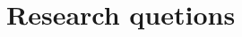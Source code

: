                                                                                                                                                                                                                                                                                                                                                                                                                                                                                                                                                                                                                                                                                                                                                                                                                                                                                                                                                                                                                                                                                                                                                                                                                                                                                                                                                                                                                                                                                                                                                                                                                                                                                                                                                                                                                                                                                                                                                                                                                                                                                                                                                                                                                                                                                                                                                                                                                                                                                                                                                                                                                           \section{Research quetions}
